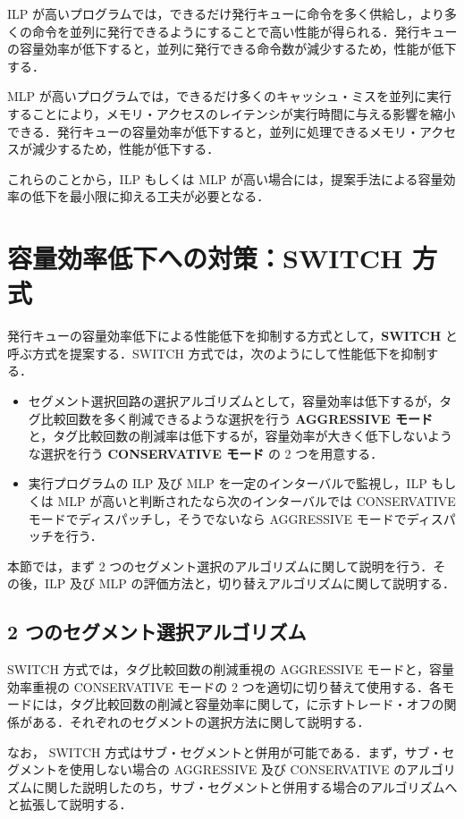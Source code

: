 ILP が高いプログラムでは，できるだけ発行キューに命令を多く供給し，より多くの命令を並列に発行できるようにすることで高い性能が得られる．発行キューの容量効率が低下すると，並列に発行できる命令数が減少するため，性能が低下する．

MLP が高いプログラムでは，できるだけ多くのキャッシュ・ミスを並列に実行することにより，メモリ・アクセスのレイテンシが実行時間に与える影響を縮小できる．発行キューの容量効率が低下すると，並列に処理できるメモリ・アクセスが減少するため，性能が低下する．

これらのことから，ILP もしくは MLP が高い場合には，提案手法による容量効率の低下を最小限に抑える工夫が必要となる．

\section{容量効率低下への対策：SWITCH 方式}
\label{sec:switch}
発行キューの容量効率低下による性能低下を抑制する方式として，\textbf{SWITCH} と呼ぶ方式を提案する．SWITCH 方式では，次のようにして性能低下を抑制する．
\begin{itemize}
  \item セグメント選択回路の選択アルゴリズムとして，容量効率は低下するが，タグ比較回数を多く削減できるような選択を行う \textbf{AGGRESSIVE モード} と，タグ比較回数の削減率は低下するが，容量効率が大きく低下しないような選択を行う \textbf{CONSERVATIVE モード} の 2 つを用意する．
  \item 実行プログラムの ILP 及び MLP を一定のインターバルで監視し，ILP もしくは MLP が高いと判断されたなら次のインターバルでは CONSERVATIVE モードでディスパッチし，そうでないなら AGGRESSIVE モードでディスパッチを行う．
\end{itemize}

本節では，まず 2 つのセグメント選択のアルゴリズムに関して説明を行う．その後，ILP 及び MLP の評価方法と，切り替えアルゴリズムに関して説明する．

\subsection{2 つのセグメント選択アルゴリズム}
\label{sec:two_mode}
SWITCH 方式では，タグ比較回数の削減重視の AGGRESSIVE モードと，容量効率重視の CONSERVATIVE モードの 2 つを適切に切り替えて使用する．各モードには，タグ比較回数の削減と容量効率に関して，に示すトレード・オフの関係がある．それぞれのセグメントの選択方法に関して説明する．

なお， SWITCH 方式はサブ・セグメントと併用が可能である．まず，サブ・セグメントを使用しない場合の AGGRESSIVE 及び CONSERVATIVE のアルゴリズムに関した説明したのち，サブ・セグメントと併用する場合のアルゴリズムへと拡張して説明する．

